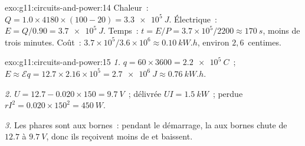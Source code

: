 \begin{solution}{exo:g11:circuits-and-power:14}
Chaleur~: $Q = 1.0 \times 4180 \times (100 - 20) = \qty{3.3e5}{J}$.
Électrique~: $E = Q/0.90 = \qty{3.7e5}{J}$. Temps~: $t = E/P =
3.7\times10^{5}/2200 \approx \qty{170}{s}$, moins de trois minutes.
Coût~: $3.7\times10^{5}/3.6\times10^{6} \approx \qty{0.10}{kW.h}$,
environ $2{,}6$~centimes.
\end{solution}

\begin{solution}{exo:g11:circuits-and-power:15}
\emph{1.} $q = 60 \times 3600 = \qty{2.2e5}{C}$~; $E \approx \mathcal{E}q
= 12.7 \times 2.16\times10^{5} = \qty{2.7e6}{J} \approx \qty{0.76}{kW.h}$.

\emph{2.} $U = 12.7 - 0.020 \times 150 = \qty{9.7}{V}$~; délivrée
$UI = \qty{1.5}{kW}$~; perdue $rI^2 = 0.020 \times 150^2 = \qty{450}{W}$.

\emph{3.} Les phares sont aux bornes~: pendant le démarrage, la
 aux bornes chute de $12.7$ à
$\qty{9.7}{V}$, donc ils reçoivent moins de
 et baissent.
\end{solution}

